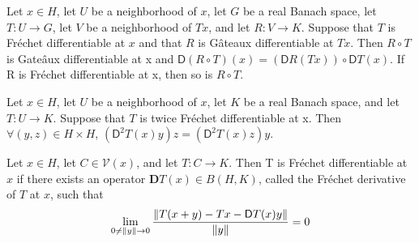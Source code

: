\begin{fact}
	Let $x\in H$,  let $U$ be a neighborhood of $x$, let $G$ be a real Banach space, let $T:U\rightarrow G$, let $V$ be a neighborhood of $Tx$, and let $R : V \rightarrow K$.
	Suppose that $T$ is Fréchet differentiable at $x$ and that $R$ is Gâteaux differentiable at $Tx$. Then $R\circ T$ is Gate\^aux differentiable at x and $\mathsf{D}(R \circ T )(x) =
	(\mathsf{D}R(Tx))\circ \mathsf{D}T (x)$. If R is Fr\'echet differentiable at x, then so is $R \circ T $.
\end{fact}

\begin{fact}
	Let $x \in H$, let $U$ be a neighborhood of $x$, let $K$ be a real Banach
	space, and let $T: U \rightarrow K$. Suppose that $T$ is twice Fr\'echet differentiable at x.
	Then $\forall(y, z) \in H \times H$,  $(\mathsf{D}^2 T (x)y)z = (\mathsf{D}^2 T (x)z)y$.
\end{fact}

\begin{definition}
	Let $x \in H$, let $C \in \mathcal{V}(x)$, and let $T : C \rightarrow K$. Then T is
	Fr\'echet differentiable at $x$ if there exists an operator $\mathbf{D}T (x) \in B(H, K)$, called the Fréchet derivative of $T$ at $x$, such that
	\[
	\lim_{0\neq\left\lVert y\right\rVert\rightarrow 0}\frac{\left\lVert T(x+y)-Tx-\mathsf{D}T(x)y\right\rVert}{\left\lVert y\right\rVert}=0
	\]
\end{definition}